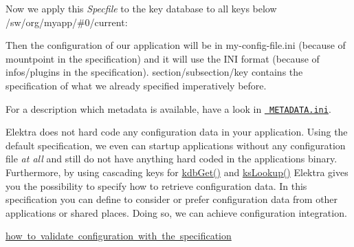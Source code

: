 Now we apply this {\itshape Specfile} to the key database to all keys below {\ttfamily /sw/org/myapp/\#0/current}\+:


\begin{DoxyCode}{0}
\end{DoxyCode}


Then the configuration of our application will be in my-\/config-\/file.\+ini (because of {\ttfamily mountpoint} in the specification) and it will use the I\+NI format (because of {\ttfamily infos/plugins} in the specification). {\ttfamily section/subsection/key} contains the specification of what we already specified imperatively before.

For a description which metadata is available, have a look in \href{/home/mpranj/workspace/libelektra/doc/METADATA.ini}{\texttt{ M\+E\+T\+A\+D\+A\+T\+A.\+ini}}.

Elektra does not hard code any configuration data in your application. Using the {\ttfamily default} specification, we even can startup applications without any configuration file {\itshape at all} and still do not have anything hard coded in the applications binary. Furthermore, by using cascading keys for {\ttfamily \mbox{\hyperlink{group__kdb_ga28e385fd9cb7ccfe0b2f1ed2f62453a1}{kdb\+Get()}}} and {\ttfamily \mbox{\hyperlink{group__keyset_gaa34fc43a081e6b01e4120daa6c112004}{ks\+Lookup()}}} Elektra gives you the possibility to specify how to retrieve configuration data. In this specification you can define to consider or prefer configuration data from other applications or shared places. Doing so, we can achieve configuration integration.


\begin{DoxyItemize}
\item \mbox{\hyperlink{validation.md_doc_tutorials_validation_md}{how to validate configuration with the specification}} 
\end{DoxyItemize}
